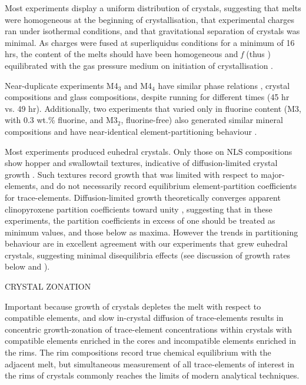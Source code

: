 Most experiments display a uniform distribution of crystals, suggesting that melts were homogeneous at the beginning of crystallisation, that experimental charges ran under isothermal conditions, and that gravitational separation of crystals was minimal. As charges were fused at superliquidus conditions for a minimum of 16 hrs, the  content of the melts should have been homogeneous and \textit{f} (thus \fO) equilibrated with the gas pressure medium on initiation of crystallisation \citep{Gaillard2002}.

Near-duplicate experiments M4$_3$ and M4$_4$ have similar phase relations
, crystal compositions and glass compositions, despite running for different times (45 hr vs. 49 hr). Additionally, two experiments that varied only in fluorine content (M3, with 0.3 wt.\% fluorine, and M3$_2$, fluorine-free) also generated similar mineral compositions and have near-identical element-partitioning behaviour \citep{Beard_PhD_Thesis}.%

Most experiments produced euhedral crystals. Only those on NLS compositions show hopper and swallowtail textures, indicative of diffusion-limited crystal growth \citep{Walker1976, Lofgren1989, Shea2013}. Such textures record growth that was limited with respect to major-elements, and do not necessarily record equilibrium element-partition coefficients for trace-elements. Diffusion-limited growth theoretically converges apparent clinopyroxene partition coefficients toward unity \citep[e.g.][]{Blundy1998}, suggesting that in these experiments, the partition coefficients in excess of one should be treated as minimum values, and those below as maxima. However the trends in partitioning behaviour are in excellent agreement with our experiments that grew euhedral crystals, suggesting minimal disequilibria effects (see discussion of growth rates below and \citealt{Mollo2013}).



CRYSTAL ZONATION













Important because growth of crystals depletes the melt with respect to compatible elements, and slow in-crystal diffusion of trace-elements results in concentric growth-zonation of trace-element concentrations within crystals with compatible elements enriched in the cores and incompatible elements enriched in the rims. The rim compositions record true chemical equilibrium with the adjacent melt, but simultaneous measurement of all trace-elements of interest in the rims of crystals commonly reaches the limits of modern analytical techniques.








